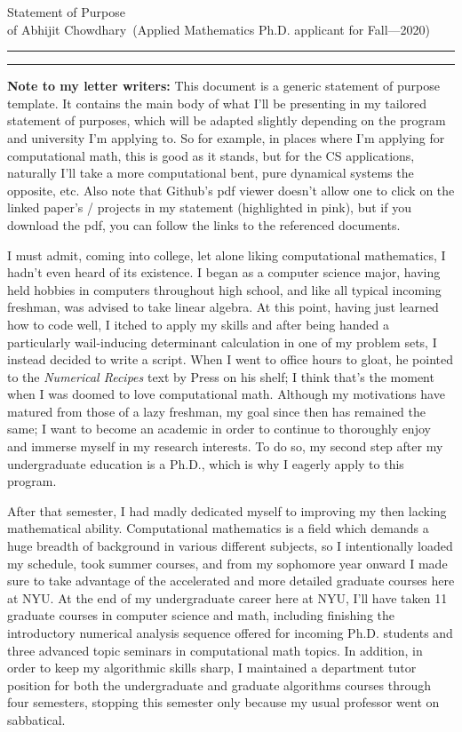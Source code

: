 \documentclass{article}
\newcommand{\soptitle}{Statement of Purpose}
\newcommand{\yourname}{Abhijit Chowdhary}
\begin{document}
\begin{center}\LARGE\soptitle\\
\large of \yourname\ (Applied Mathematics Ph.D. applicant for Fall---2020)
\end{center}

\hrule
\vspace{1pt}
\hrule height 1pt

\bigskip

\textbf{Note to my letter writers:} This document is a generic statement of purpose
template. It contains the main body of what I'll be presenting in my tailored
statement of purposes, which will be adapted slightly depending on the program
and university I'm applying to. So for example, in places where I'm applying for
computational math, this is good as it stands, but for the CS applications,
naturally I'll take a more computational bent, pure dynamical systems the
opposite, etc. Also note that Github's pdf viewer doesn't allow one to click on
the linked paper's / projects in my statement (highlighted in pink), but if you
download the pdf, you can follow the links to the referenced documents.

\vspace{5pt}

I must admit, coming into college, let alone liking computational mathematics,
I hadn't even heard of its existence. I began as a computer science major,
having held hobbies in computers throughout high school, and like all typical
incoming freshman, was advised to take linear algebra. At this point, having
just learned how to code well, I itched to apply my skills and after being
handed a particularly wail-inducing determinant calculation in one of my
problem sets, I instead decided to write a script. When I went to office hours to
gloat, he pointed to the \textit{Numerical Recipes} text by Press on his shelf;
I think that's the moment when I was doomed to love computational math. Although
my motivations have matured from those of a lazy freshman, my goal since then
has remained the same; I want to become an academic in order to continue to
thoroughly enjoy and immerse myself in my research interests. To do so, my
second step after my undergraduate education is a Ph.D., which is why I eagerly
apply to this program.

After that semester, I had madly dedicated myself to improving my then lacking
mathematical ability. Computational mathematics is a field which demands a huge
breadth of background in various different subjects, so I intentionally loaded
my schedule, took summer courses, and from my sophomore year onward I made sure
to take advantage of the accelerated and more detailed graduate courses here at
NYU. At the end of my undergraduate career here at NYU, I'll have taken 11
graduate courses in computer science and math, including finishing the
introductory numerical analysis sequence offered for incoming Ph.D. students and
three advanced topic seminars in computational math topics. In addition, in
order to keep my algorithmic skills sharp, I maintained a department tutor
position for both the undergraduate and graduate algorithms courses through four
semesters, stopping this semester only because my usual professor went on
sabbatical.
\end{document}
